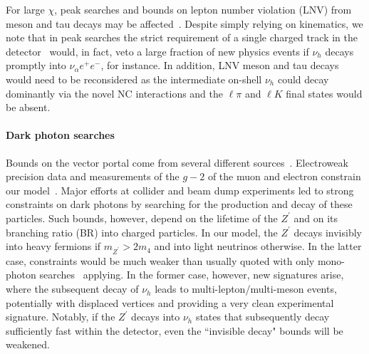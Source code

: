 For large $\chi$, peak searches and bounds on lepton number violation (LNV) from meson and tau decays may be affected~\cite{Atre:2009rg,Abada:2017jjx}. Despite simply relying on kinematics, we note that in peak searches the strict requirement of a single charged track in the detector~\cite{Artamonov:2014urb} would, in fact, veto a large fraction of new physics events if $\nu_h$ decays promptly into $\nu_\alpha e^+e^-$, for instance. In addition, LNV meson and tau decays would need to be reconsidered as the intermediate on-shell $\nu_h$ could decay dominantly via the novel NC interactions and the $\ell \pi$ and $\ell K$ final states would be absent.

\paragraph{Dark photon searches} Bounds on the vector portal come from several different sources~\cite{Curtin:2014cca,Bauer:2018onh}. Electroweak precision data and measurements of the $g-2$ of the muon and electron constrain our model~\cite{Hook:2010tw}. Major efforts at collider and beam dump experiments led to strong constraints on dark photons by searching for the production and decay of these particles. Such bounds, however, depend on the lifetime of the $Z^\prime$ and on its branching ratio (BR) into charged particles. In our model, the $Z^\prime$ decays invisibly into heavy fermions if $m_{Z^\prime} > 2 m_4$ and into light neutrinos otherwise. In the latter case, constraints would be much weaker than usually quoted with only mono-photon searches~\cite{Lees:2017lec} applying. In the former case, however, new signatures arise, where the subsequent decay of $\nu_h$ leads to multi-lepton/multi-meson events, potentially with displaced vertices and providing a very clean experimental signature. Notably, if the $Z^\prime$ decays into $\nu_h$ states that subsequently decay sufficiently fast within the detector, even the ``invisible decay" bounds will be weakened.



